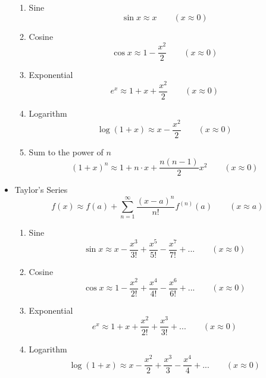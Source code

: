 \begin{itemize}
\begin{enumerate}
				\item Sine
					\begin{equation}
						\sin x \approx x \qquad (x \approx 0)
					\end{equation}
				\item Cosine
					\begin{equation}
						\cos x \approx 1 - \frac{x^2}{2} \qquad (x \approx 0)
					\end{equation}
				\item Exponential
					\begin{equation}
						e^x \approx 1+x+\frac{x^2}{2} \qquad (x \approx 0)
					\end{equation}
				\item Logarithm
					\begin{equation}
						\log(1+x) \approx x - \frac{x^2}{2} \qquad (x \approx 0)
					\end{equation}
				\item Sum to the power of $n$
					\begin{equation}
						(1+x)^n \approx 1+n \cdot x + \frac{n(n-1)}{2} x^2 \qquad (x \approx 0)
					\end{equation}
			\end{enumerate}
		\item Taylor's Series
			\begin{equation}
				f(x) \approx f(a) + \sum_{n=1}^{\infty} \frac{(x-a)^n}{n!} f^{(n)}(a) \qquad (x \approx a)
			\end{equation}
			\begin{enumerate}
				\item Sine
					\begin{equation}
						\sin x \approx x - \frac{x^3}{3!} + \frac{x^5}{5!} - \frac{x^7}{7!} + ... \qquad (x \approx 0)
					\end{equation}
				\item Cosine
					\begin{equation}
						\cos x \approx 1 - \frac{x^2}{2!} + \frac{x^4}{4!} - \frac{x^6}{6!} + ... \qquad (x \approx 0)
					\end{equation}
				\item Exponential
					\begin{equation}
						e^x \approx 1+x+\frac{x^2}{2!} + \frac{x^3}{3!} + ... \qquad (x \approx 0)
					\end{equation}
				\item Logarithm
					\begin{equation}
						\log(1+x) \approx x - \frac{x^2}{2} + \frac{x^3}{3} - \frac{x^4}{4} + ... \qquad (x \approx 0)

\end{equation}
\end{enumerate}
\end{itemize}
